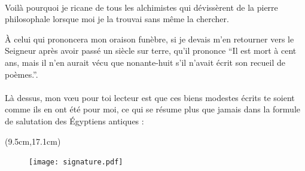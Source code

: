 {  \paragraph{}
  Voilà pourquoi je ricane de tous les alchimistes qui dévissèrent de la pierre philosophale lorsque moi je la trouvai sans même la chercher.

  À celui qui prononcera mon oraison funèbre, si je devais m’en retourner vers le Seigneur après avoir passé un siècle sur terre, qu’il prononce \enquote{Il est mort à cent ans, mais il n’en aurait vécu que nonante-huit s’il n’avait écrit son recueil de poèmes.}.



  \paragraph{}
  Là dessus, mon vœu pour toi lecteur est que ces biens modestes écrits te soient comme ils en ont été pour moi, ce qui se résume plus que jamais dans la formule de salutation des Égyptiens antiques :

  \begin{textblock*}{3cm}(9.5cm,17.1cm) 
    \begin{figure}[h]
      \begin{flushright}
        \texttt{[image: signature.pdf]}
        \captionsetup{labelformat=empty}
      \end{flushright}
    \end{figure}
  \end{textblock*}
}

